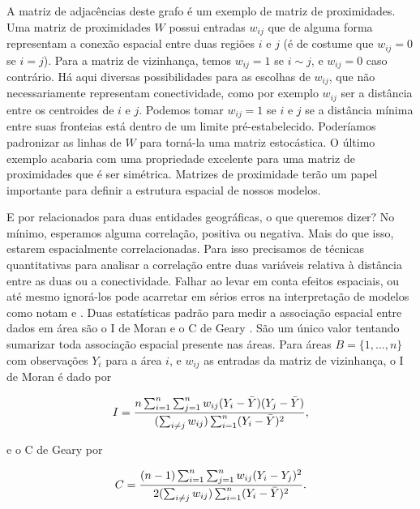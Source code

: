 A matriz de adjacências deste grafo é um exemplo de matriz de proximidades.
Uma matriz de proximidades $W$ possui entradas $w_{ij}$ que de alguma forma representam a conexão espacial entre duas regiões $i$ e $j$ (é de costume que $w_{ij} = 0$ se $ i=j$).
Para a matriz de vizinhança, temos $w_{ij} = 1$ se $i\sim j$, e $w_{ij} = 0$ caso contrário.
Há aqui diversas possibilidades para as escolhas de $w_{ij}$, que não necessariamente representam conectividade, como por exemplo $w_{ij}$ ser a distância entre os centroides de $i$ e $j$.
Podemos tomar $w_{ij}  = 1$ se $i$ e $j$ se a distância mínima entre suas fronteias está dentro de um limite pré-estabelecido.
Poderíamos padronizar as linhas de $W$ para torná-la uma matriz estocástica.
O último exemplo acabaria com uma propriedade excelente para uma matriz de proximidades que é ser simétrica. Matrizes de proximidade terão um papel importante para definir a estrutura espacial de nossos modelos.


E por relacionados para duas entidades geográficas, o que queremos dizer?
No mínimo, esperamos alguma correlação, positiva ou negativa.
Mais do que isso, estarem espacialmente correlacionadas.
Para isso precisamos de técnicas quantitativas para analisar a correlação entre duas variáveis relativa à distância entre as duas ou a conectividade.
Falhar ao levar em conta efeitos espaciais, ou até mesmo ignorá-los pode acarretar em sérios erros na interpretação de modelos como notam \cite{Anselin1988} e \cite{Arbia1989}.
Duas estatísticas padrão para medir a associação espacial entre dados em área são o I de Moran \cite{Moran1950} e o C de Geary \cite{Geary1954}.
São um único valor tentando sumarizar toda associação espacial presente nas áreas.
Para áreas $B = \{1, \dots, n\}$ com observações $Y_i$ para a área $i$, e $w_{ij}$ as entradas da matriz de vizinhança, o I de Moran é dado por

\begin{equation}
    I = \frac{n \sum_{i=1}^n \sum_{j=1}^n w_{ij} (Y_i - \Bar{Y})(Y_j - \Bar{Y})}{(\sum_{i \neq j} w_{ij})\sum_{i=1}^n(Y_i - \Bar{Y})^2},
\end{equation}

e o C de Geary por

\begin{equation}
    C = \frac{(n-1) \sum_{i=1}^n \sum_{j=1}^n w_{ij} (Y_i - Y_j)^2}{2(\sum_{i \neq j} w_{ij})\sum_{i=1}^n(Y_i - \Bar{Y})^2}.
\end{equation}

